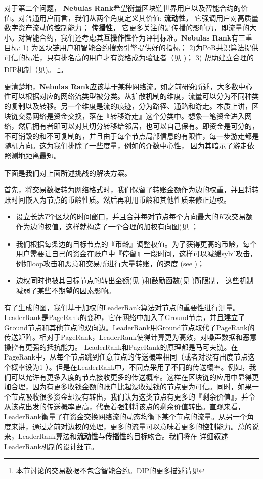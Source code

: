 对于第二个问题， \textbf{Nebulas Rank}希望衡量区块链世界用户以及智能合约的价值。对普通用户而言，我们从两个角度定义其价值: \textbf{流动性}， 它强调用户对高质量数字资产流动的控制能力； \textbf{传播性}， 它更多关注的是传播的影响力，即流量的大小。对智能合约，我们还考虑其\textbf{互操作性}作为评判标准。\textbf{Nebulas Rank}有三重目标: 1) 为区块链用户和智能合约搜索引擎提供好的指标； 2)为PoR共识算法提供可信的标准，只有排名高的用户才有资格成为验证者（见 )； 3) 帮助建立合理的DIP机制（见)。 \footnote{本节讨论的交易数据不包含智能合约。DIP的更多描述请见}。

更清楚地，\textbf{Nebulas Rank}应该基于某种网络流。如之前研究所述\cite{Borgatti2005}，大多数中心性可以根据对应的网络流类型被分类。从扩散机制的维度，流量可以分为不同种类的复制以及转移。另一个维度是流的痕迹，分为路径、通路和游走。本质上讲，区块链交易网络是资金交换，落在『转移游走』这个分类中。想象一笔资金进入网络，然后拥有者即可以对其切分转移给邻居，也可以自己保有。即资金是可分的，不可销毁的和不可复制的，并且由于每个节点局部信息的有限性，每一步游走都是随机方向。这为我们排除了一些度量，例如\textcite{freeman1977set}的介数中心性， 因为其暗示了游走依照测地距离最短。

下面是我们对上面所述挑战的解决方案。

首先，将交易数据转为网络格式时，我们保留了转账金额作为边的权重，并且将转账时间嵌入为节点的币龄性质。然后再利用币龄和其他性质来修正边权。
\begin{itemize}
	\item 设立长达$T$个区块的时间窗口，并且合并每对节点每个方向最大的$K$次交易额作为边的权值，这样就构造了一个合理的加权有向图(见 ；
	\item 我们根据每条边的目标节点的『币龄』调整权值。为了获得更高的币龄，每个用户需要让自己的资金在账户中『停留』一段时间，这样可以减缓sybil攻击，例如loop攻击和恶意和交易所进行大量转账，的速度 (see )；
	\item 边权同时也被其目标节点的转出金额(见 )和鼓励函数(见 )所限制， 这些机制减弱了某些不期望的因素影响。
\end{itemize}

有了生成的图，我们基于加权的LeaderRank算法\cite{Chen2013}\cite{Li2014}对节点的重要性进行测量。LeaderRank是PageRank的变种，它在网络中加入了Ground节点，并且建立了Ground节点和其他节点的双向边。LeaderRank用Ground节点取代了PageRank的传送矩阵。相对于PageRank，LeaderRank使得计算更为高效，对噪声数据和恶意操控有更强的抵抗能力\cite{Chen2013}。 LeaderRank和PageRank的原理都是马可夫链。在PageRank中，从每个节点跳到任意节点的传送概率相同（或者对没有出度节点这个概率设为1 \cite{Kim2002}）。但是在LeaderRank中，不同点采用了不同的传送概率。例如，我们可以允许有更多入度的节点接收更多的传送概率。这样在区块链的应用中显得更加合理，因为有更多收钱金额的账户比起没收过钱的节点更为可信。同时，如果一个节点吸收很多资金却没有转出，我们认为这类节点有更多的『剩余价值』，并令从该点出发的传送概率更高，代表着强制将该点的剩余价值转出。直观来看，LeaderRank衡量了在资金交换网络流的动态均衡下某个节点的流量。从另一个角度来讲，通过之前对边权的处理，更多的流量可以意味着更多的控制能力。总的说来，LeaderRank算法和\textbf{流动性}与\textbf{传播性}的目标吻合。我们将在 详细叙述LeaderRank机制的设计细节。

